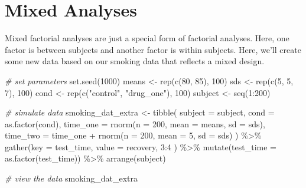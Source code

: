 \documentclass[
]{book}
\newenvironment{Shaded}{\begin{snugshade}}{\end{snugshade}}
\newcommand{\AttributeTok}[1]{\textcolor[rgb]{0.77,0.63,0.00}{#1}}
\newcommand{\CommentTok}[1]{\textcolor[rgb]{0.56,0.35,0.01}{\textit{#1}}}
\newcommand{\DecValTok}[1]{\textcolor[rgb]{0.00,0.00,0.81}{#1}}
\newcommand{\FunctionTok}[1]{\textcolor[rgb]{0.00,0.00,0.00}{#1}}
\newcommand{\NormalTok}[1]{#1}
\newcommand{\OtherTok}[1]{\textcolor[rgb]{0.56,0.35,0.01}{#1}}
\newcommand{\SpecialCharTok}[1]{\textcolor[rgb]{0.00,0.00,0.00}{#1}}
\newcommand{\StringTok}[1]{\textcolor[rgb]{0.31,0.60,0.02}{#1}}
\begin{document}
\hypertarget{mixed-analyses}{%
\section{Mixed Analyses}\label{mixed-analyses}}

Mixed factorial analyses are just a special form of factorial analyses. Here, one factor is between subjects and another factor is within subjects. Here, we'll create some new data based on our smoking data that reflects a mixed design.

\begin{Shaded}
\begin{Highlighting}[]
\CommentTok{\# set parameters}
\FunctionTok{set.seed}\NormalTok{(}\DecValTok{1000}\NormalTok{)}
\NormalTok{means }\OtherTok{\textless{}{-}} \FunctionTok{rep}\NormalTok{(}\FunctionTok{c}\NormalTok{(}\DecValTok{80}\NormalTok{, }\DecValTok{85}\NormalTok{), }\DecValTok{100}\NormalTok{)}
\NormalTok{sds }\OtherTok{\textless{}{-}} \FunctionTok{rep}\NormalTok{(}\FunctionTok{c}\NormalTok{(}\DecValTok{5}\NormalTok{, }\DecValTok{5}\NormalTok{, }\DecValTok{7}\NormalTok{), }\DecValTok{100}\NormalTok{)}
\NormalTok{cond }\OtherTok{\textless{}{-}} \FunctionTok{rep}\NormalTok{(}\FunctionTok{c}\NormalTok{(}\StringTok{"control"}\NormalTok{, }\StringTok{"drug\_one"}\NormalTok{), }\DecValTok{100}\NormalTok{)}
\NormalTok{subject }\OtherTok{\textless{}{-}} \FunctionTok{seq}\NormalTok{(}\DecValTok{1}\SpecialCharTok{:}\DecValTok{200}\NormalTok{)}

\CommentTok{\# simulate data}
\NormalTok{smoking\_dat\_extra }\OtherTok{\textless{}{-}} \FunctionTok{tibble}\NormalTok{(}
  \AttributeTok{subject =}\NormalTok{ subject,}
  \AttributeTok{cond =} \FunctionTok{as.factor}\NormalTok{(cond),}
  \AttributeTok{time\_one =} \FunctionTok{rnorm}\NormalTok{(}\AttributeTok{n =} \DecValTok{200}\NormalTok{, }\AttributeTok{mean =}\NormalTok{ means, }\AttributeTok{sd =}\NormalTok{ sds),}
  \AttributeTok{time\_two =}\NormalTok{ time\_one }\SpecialCharTok{+} \FunctionTok{rnorm}\NormalTok{(}\AttributeTok{n =} \DecValTok{200}\NormalTok{, }\AttributeTok{mean =} \DecValTok{5}\NormalTok{, }\AttributeTok{sd =}\NormalTok{ sds)}
\NormalTok{  ) }\SpecialCharTok{\%\textgreater{}\%}
  \FunctionTok{gather}\NormalTok{(}\AttributeTok{key =}\NormalTok{ test\_time,}
         \AttributeTok{value =}\NormalTok{ recovery,}
         \DecValTok{3}\SpecialCharTok{:}\DecValTok{4}
\NormalTok{         ) }\SpecialCharTok{\%\textgreater{}\%}
  \FunctionTok{mutate}\NormalTok{(}\AttributeTok{test\_time =} \FunctionTok{as.factor}\NormalTok{(test\_time)) }\SpecialCharTok{\%\textgreater{}\%}
  \FunctionTok{arrange}\NormalTok{(subject)}

\CommentTok{\# view the data}
\NormalTok{smoking\_dat\_extra}
\end{Highlighting}
\end{Shaded}
\end{document}
